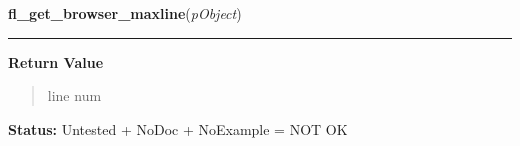     \label{xformslib:library:fl_get_browser_maxline}

    \vspace{0.5ex}

\hspace{.8\funcindent}\begin{boxedminipage}{\funcwidth}

    \raggedright \textbf{fl\_get\_browser\_maxline}(\textit{pObject})

    \vspace{-1.5ex}

    \rule{\textwidth}{0.5\fboxrule}
\setlength{\parskip}{2ex}
\setlength{\parskip}{1ex}
      \textbf{Return Value}
    \vspace{-1ex}

      \begin{quote}
      line num

      \end{quote}

\textbf{Status:} Untested + NoDoc + NoExample = NOT OK



    \end{boxedminipage}

    \label{xformslib:library:fl_get_browser_screenlines}

    \vspace{0.5ex}

